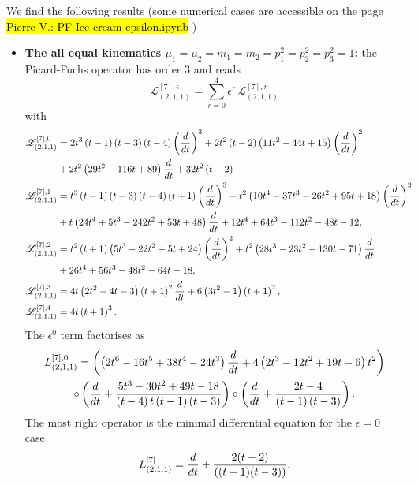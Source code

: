 \documentclass[a4paper,12pt]{article}
\numberwithin{equation}{section}
\numberwithin{figure}{section}
\newcommand{\pvnote}[1]{\sethlcolor{bubblegum} \protect\hl{Pierre V.: #1} \sethlcolor{yellow}}
\begin{document}
We find the following results (some numerical cases are accessible on
the page \pvnote{PF-Ice-cream-epsilon.ipynb})
\begin{itemize}
	\item {\bf The all equal kinematics
		$\mu_1=\mu_2=m_1=m_2=p_1^2=p_2^2=p_3^2=1$:} the Picard-Fuchs operator
	has order 3 and
	reads
	\begin{equation}
		\mathscr{L}_{(2,1,1)}^{[7],\epsilon}=\sum_{r=0}^4 \epsilon^r\,\mathscr{L}_{(2,1,1)}^{[7],r}
	\end{equation}
	with
	\begin{align}
		\mathscr{L}_{(2,1,1)}^{[7],0}&= 2 t^{3} \left(t -1\right)
		\left(t -3\right) \left(t -4\right) \left(d\over dt\right)^{3}+2 t^{2} \left(t
		-2\right) \left(11 t^{2}-44 t +15\right) \left(d\over dt\right)^{2}\cr&+2 t^{2}
		\left(29 t^{2}-116 t +89\right) {d\over dt} +32 t^{2} \left(t
		-2\right)\cr
		\mathscr{L}_{(2,1,1)}^{[7],1}&=t^{3} \left(t -1\right) \left(t -3\right) \left(t -4\right) \left(t +1\right) \left(d\over dt\right)^{3}+t^{2} \left(10 t^{4}-37 t^{3}-26 t^{2}+95 t +18\right) \left(d\over dt\right)^{2}\cr&+t \left(24 t^{4}+5 t^{3}-242 t^{2}+53 t +48\right)  {d\over dt} +12 t^{4}+64 t^{3}-112 t^{2}-48 t -12,\cr
		\mathscr{L}_{(2,1,1)}^{[7],2}&=t^{2} \left(t +1\right) \left(5 t^{3}-22 t^{2}+5 t +24\right) \left(d\over dt\right)^{2}+t^{2} \left(28 t^{3}-23 t^{2}-130 t -71\right)  {d\over dt} \cr&+26 t^{4}+56 t^{3}-48 t^{2}-64 t -18,\cr
		\mathscr{L}_{(2,1,1)}^{[7],3}&=4 t \left(2 t^{2}-4 t -3\right) \left(t +1\right)^{2}
		{d\over dt}+6 \left(3 t^{2}-1\right) \left(t +1\right)^{2},\cr
		\mathscr{L}_{(2,1,1)}^{[7],4}&= 4 t \left(t +1\right)^{3}.
	\end{align}
	The $\epsilon^0$ term factorises as
	\begin{multline}
		L_{(2,1,1)}^{[7],0}=\left(
		\left(2 t^{6}-16 t^{5}+38 t^{4}-24 t^{3}\right) {{d\over dt}} +4 \left(2 t^{3}-12 t^{2}+19 t -6\right) t^{2}\right)\cr\circ
		\left(
		{{d\over dt}} +\frac{5 t^{3}-30 t^{2}+49 t -18}{\left(t -4\right) t \left(t -1\right) \left(t -3\right)}
		\right)\circ \left({{d\over dt}} +\frac{2 t -4}{\left(t -1\right) \left(t -3\right)}
		\right).
	\end{multline}
	The most right operator is the minimal differential equation for the
	$\epsilon=0$ case~\cite{Lairez:2022zkj}
	\begin{equation}
		L_{(2,1,1)}^{[7]}= {d\over dt}+ {2(t - 2)\over ((t - 1)(t - 3))  }.
	\end{equation}
	

\end{itemize}
\end{document}
